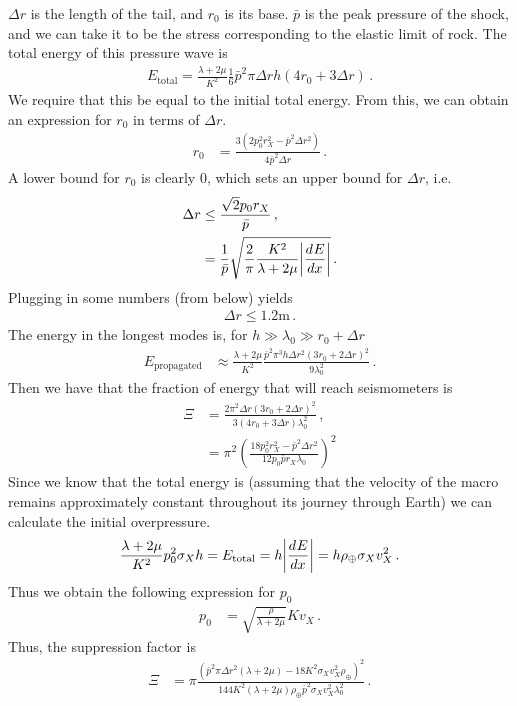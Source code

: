 \documentclass{article}
\newcommand*\te[1]{\text{#1}}
\newcommand*\p[1]{\left(#1\right)}
\newcommand*\f[2]{\frac{#1}{#2}}
\newcommand*\td[3]{\frac{d^{#3}#1}{d #2^{#3}}}
\begin{document}
$\Delta r$ is the length of the tail, and $r_0$ is its base. $\bar p$ is the peak pressure of the shock, and we can take it to be the stress corresponding to the elastic limit of rock. The total energy of this pressure wave is
\begin{align}
E_{\te{total}}=\f{\lambda+2\mu}{K^2}\f16 \bar p^2 \pi\Delta r h(4 r_0+3\Delta r)\,.
\end{align}
We require that this be equal to the initial total energy. From this, we can obtain an expression for $r_0$ in terms of $\Delta r$.
\begin{align}
r_0&=\f{3(2p_0^2r_X^2-\bar p^2\Delta r^2)}{4\bar p^2\Delta r}\,.
\end{align}
A lower bound for $r_0$ is clearly 0, which sets an upper bound for $\Delta r$, i.e.
\begin{align}
\Delta r&\leq \f{\sqrt{2}p_0r_X}{\bar p}\,,\\
&=\f{1}{\bar p}\sqrt{\f{2}{\pi}\f{K^2}{\lambda+2\mu}\abs{\td{E}{x}{}}}\,.
\end{align}
Plugging in some numbers (from below) yields
\begin{align}
\Delta r\leq 1.2\te{m}\,.
\end{align}
The energy in the longest modes is, for $h\gg\lambda_0\gg r_0+\Delta r$
\begin{align}
E_{\te{propagated}}&\approx\f{\lambda+2\mu}{K^2}\f{\bar p^2 \pi^3 h \Delta r^2(3r_0+2\Delta r)^2}{9\lambda_0^2}\,.
\end{align}
Then we have that the fraction of energy that will reach seismometers is
\begin{align}
\Xi&=\f{2\pi^2\Delta r(3r_0+2\Delta r)^2}{3(4 r_0+3\Delta r)\lambda_0^2}\,,\\
&=\pi^2\p{\f{18 p_0^2 r_X^2-\bar p^2\Delta r^2}{12 p_0\bar p r_X\lambda_0}}^2
\end{align}
Since we know that the total energy is (assuming that the velocity of the macro remains approximately constant throughout its journey through Earth) we can calculate the initial overpressure.
\begin{align}
\f{\lambda+2\mu}{K^2}p_0^2\sigma_Xh=E_{\te{total}}=h\abs{\td{E}{x}{}}=h\rho_{\oplus}\sigma_Xv_X^2\,.
\end{align}
Thus we obtain the following expression for $p_0$
\begin{align}
p_0&=\sqrt{\f{\rho}{\lambda+2\mu}}Kv_X\,.
\end{align}
Thus, the suppression factor is
\begin{align}
\Xi&=\pi \f{(\bar p^2\pi \Delta r^2(\lambda+2\mu)-18K^2\sigma_Xv_X^2\rho_{\oplus})^2}{144K^2(\lambda+2\mu)\rho_{\oplus}\bar p^2 \sigma_X v_X^2\lambda_0^2}\,.
\end{align}
\end{document}
